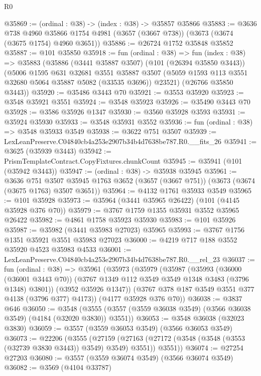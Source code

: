 \begin{lexlean}{R0}
\begin{coremodule}
@35869 := (ordinal : @38) -> (index : @38) -> @35857 @35866
@35883 := @3636
    @738
    @4960
    @35866
    @1754
    @4981
    (@3657 (@3667 @738))
    (@3673 (@3674 (@3675 @1754) @4960 @3651))
@35886 := @26724 @1752 @35848 @35852
@35887 := @101 @35850
@35918 := fun (ordinal : @38) =>
  fun (index : @38) =>
  @35883
    (@35886
      (@3441 @35887 @3507)
      (@101 (@26394 @35850 @3443))
      (@5006
        @1595
        @631
        @32681
        @3551
        @35887
        @3507
        (@5059 @1593 @113 @3551 @32680 @5064 @35887 @5082 (@33535 @3696))
        @23521)
      (@26766 @35850 @3443))
@35920 := @35486 @3443 @70
@35921 := @3553 @35920
@35923 := @3548 @35921 @3551
@35924 := @3548 @35923
@35926 := @35490 @3443 @70
@35928 := @3586 @35926 @1347
@35930 := @3560 @35928 @3593
@35931 := @35924 @35930
@35933 := @3548 @35931 @3552
@35936 := fun (ordinal : @38) => @3548 @35933 @3549
@35938 := @3622 @751 @3507
@35939 := LexLeanPreserve.C04840cb4a253e2907b34b4d7638be787.R0.__fits_26
@35941 := @3625 (@35939 @3443)
@35942 := PrismTemplateContract.CopyFixtures.chunkCount
@35945 := @35941 (@101 (@35942 @3443))
@35947 := (ordinal : @38) -> @35938 @35945
@35961 := @3636
    @751
    @3507
    @35945
    @1763
    @3652
    (@3657 (@3667 @751))
    (@3673 (@3674 (@3675 @1763) @3507 @3651))
@35964 := @4132 @1761 @35933 @3549
@35965 := @101 @35928
@35973 := @35964 (@3441 @35965 @26422) (@101 (@4145 @35928 @376 @70))
@35979 := @3767 @1759 @1355 @35931 @3552 @35965 @26422
@35982 := @4861 @1758 @35923 @35930
@35983 := @101 @35926
@35987 := @35982 (@3441 @35983 @27023) @35965
@35993 := @3767 @1756 @1351 @35921 @3551 @35983 @27023
@36000 := @4219 @717 @188 @3552 @35920 @4523 @35983 @4533
@36001 := LexLeanPreserve.C04840cb4a253e2907b34b4d7638be787.R0.__rel_23
@36037 := fun (ordinal : @38) =>
  @35961
    (@35973
      (@35979
        (@35987
          (@35993
            (@36000 (@36001 @3443 @70))
            (@3767 @1349 @112 @3549 @3549 @1348 @3483 (@3796 @1348) @3801))
          (@3952 @35926 @1347))
        (@3767 @378 @187 @3549 @3551 @377 @4138 (@3796 @377) @4173))
      (@4177 @35928 @376 @70))
@36038 := @3837 @646
@36050 := @3548
    (@3555 (@3557 (@3559 @36038 @3549) (@3566 @36038 @3549) (@4184 (@32020 @3830)) @3551))
@36053 := @3548 @36038 (@32023 @3830)
@36059 := @3557 (@3559 @36053 @3549) (@3566 @36053 @3549)
@36073 := @22206
    (@3555
      (@27159
        (@27163 (@27172 (@3548 (@3548 (@3553 (@32739 @3830 @3443)) @3549) @3549) @3551))
        @3551))
@36074 := @27254 @27203
@36080 := @3557 (@3559 @36074 @3549) (@3566 @36074 @3549)
@36082 := @3569 (@4104 @33787)

\end{coremodule}
\end{lexlean}
